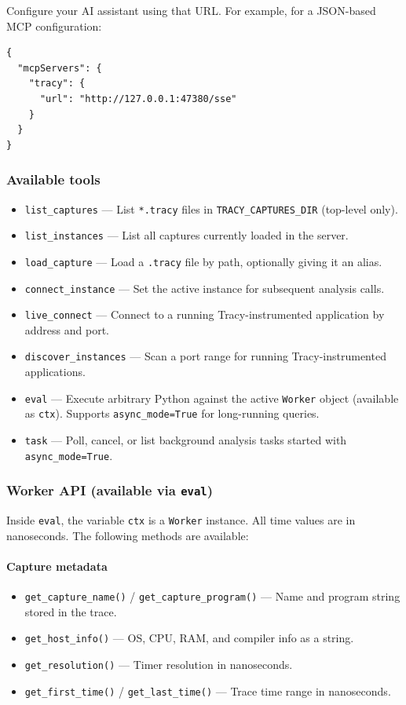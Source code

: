 \documentclass[hidelinks,titlepage,a4paper,twoside]{article}
\begin{document}
Configure your AI assistant using that URL. For example, for a JSON-based MCP configuration:

\begin{lstlisting}
{
  "mcpServers": {
    "tracy": {
      "url": "http://127.0.0.1:47380/sse"
    }
  }
}
\end{lstlisting}

\subsubsection{Available tools}

\begin{itemize}
\item \texttt{list\_captures} --- List \texttt{*.tracy} files in \texttt{TRACY\_CAPTURES\_DIR} (top-level only).
\item \texttt{list\_instances} --- List all captures currently loaded in the server.
\item \texttt{load\_capture} --- Load a \texttt{.tracy} file by path, optionally giving it an alias.
\item \texttt{connect\_instance} --- Set the active instance for subsequent analysis calls.
\item \texttt{live\_connect} --- Connect to a running Tracy-instrumented application by address and port.
\item \texttt{discover\_instances} --- Scan a port range for running Tracy-instrumented applications.
\item \texttt{eval} --- Execute arbitrary Python against the active \texttt{Worker} object (available as \texttt{ctx}). Supports \texttt{async\_mode=True} for long-running queries.
\item \texttt{task} --- Poll, cancel, or list background analysis tasks started with \texttt{async\_mode=True}.
\end{itemize}

\subsubsection{Worker API (available via \texttt{eval})}

Inside \texttt{eval}, the variable \texttt{ctx} is a \texttt{Worker} instance. All time values are in nanoseconds. The following methods are available:

\paragraph{Capture metadata}
\begin{itemize}
\item \texttt{get\_capture\_name()} / \texttt{get\_capture\_program()} --- Name and program string stored in the trace.
\item \texttt{get\_host\_info()} --- OS, CPU, RAM, and compiler info as a string.
\item \texttt{get\_resolution()} --- Timer resolution in nanoseconds.
\item \texttt{get\_first\_time()} / \texttt{get\_last\_time()} --- Trace time range in nanoseconds.
\end{itemize}
\end{document}
